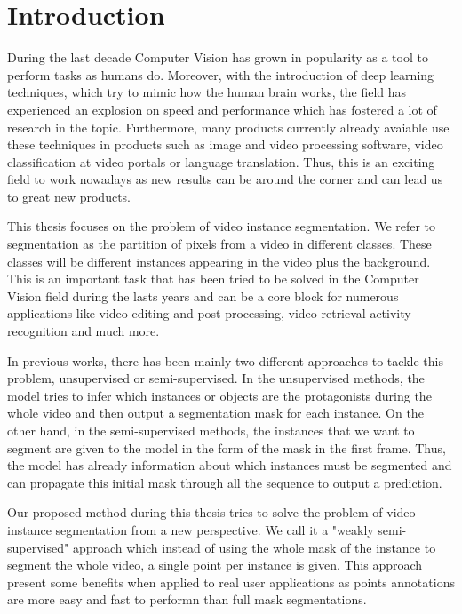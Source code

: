 
\chapter{Introduction}
\label{cha:introduction}

During the last decade Computer Vision has grown in popularity as a tool to perform tasks as humans do.
Moreover, with the introduction of deep learning techniques, which try to mimic how the human brain works, the field has experienced an explosion on speed and performance which has fostered a lot of research in the topic.
Furthermore, many products currently already avaiable use these techniques in products such as image and video processing software, video classification at video portals or language translation.
Thus, this is an exciting field to work nowadays as new results can be around the corner and can lead us to great new products.


This thesis focuses on the problem of video instance segmentation.
We refer to segmentation as the partition of pixels from a video in different classes.
These classes will be different instances appearing in the video plus the background.
This is an important task that has been tried to be solved in the Computer Vision field during the lasts years and can be a core block for numerous applications like video editing and post-processing, video retrieval activity recognition and much more.

In previous works, there has been mainly two different approaches to tackle this problem, unsupervised or semi-supervised.
In the unsupervised methods, the model tries to infer which instances or objects are the protagonists during the whole video and then output a segmentation mask for each instance.
On the other hand, in the semi-supervised methods, the instances that we want to segment are given to the model in the form of the mask in the first frame.
Thus, the model has already information about which instances must be segmented and can propagate this initial mask through all the sequence to output a prediction.

Our proposed method during this thesis tries to solve the problem of video instance segmentation from a new perspective.
We call it a "weakly semi-supervised" approach which instead of using the whole mask of the instance to segment the whole video, a single point per instance is given.
This approach present some benefits when applied to real user applications as points annotations are more easy and fast to performn than full mask segmentations.

